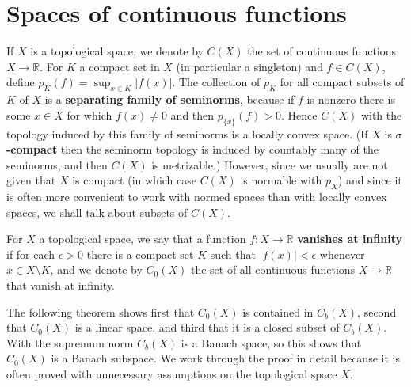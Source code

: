 \documentclass{article}
\theoremstyle{definition}
\begin{document}
\section{Spaces of continuous functions}
If $X$ is a topological space, we denote by $C(X)$ the set of continuous functions $X \to \mathbb{R}$. For
$K$ a compact set in $X$ (in particular a singleton) and $f \in C(X)$, define $p_K(f)=\sup_{x \in K} |f(x)|$. The collection
of $p_K$ for all compact subsets of $K$ of $X$ is a \textbf{separating family of seminorms}, because if $f$ is nonzero there is some $x \in X$ for which
$f(x) \neq 0$ and then $p_{\{x\}}(f) >0$. Hence $C(X)$ with the topology induced by this family of seminorms is a locally convex space. (If $X$ is 
\textbf{$\sigma$-compact} then the seminorm topology is induced by countably many of the seminorms, and then $C(X)$ is metrizable.)
However, since we usually are not given that $X$ is compact (in which case $C(X)$ is normable with $p_X$)
 and since it is often more convenient to work with normed spaces than
with locally convex spaces, we shall talk about subsets of $C(X)$.


For $X$ a topological space, we say that a function $f:X \to \mathbb{R}$ \textbf{vanishes at infinity} if for each $\epsilon>0$ there is a compact set $K$
such that $|f(x)|<\epsilon$ whenever $x \in X \setminus K$, and we denote by $C_0(X)$ the set of all continuous functions
$X \to \mathbb{R}$ that vanish at infinity.

The following theorem shows first that $C_0(X)$ is contained in $C_b(X)$, second that $C_0(X)$ is a linear space, and third that it is a closed
subset of $C_b(X)$. With the supremum norm $C_b(X)$ is a Banach space, so this shows
that $C_0(X)$ is a Banach subspace. We work through the proof in detail because it is often proved
with unnecessary assumptions on the topological space $X$.  
\end{document}
